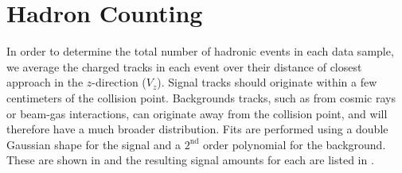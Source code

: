 \section{Hadron Counting}
\label{sec:hadron_counting}

In order to determine the total number of hadronic events in each data sample, we average the charged tracks in each event over their distance of closest approach in the $z$-direction ($V_z$).
Signal tracks should originate within a few centimeters of the collision point.
Backgrounds tracks, such as from cosmic rays or beam-gas interactions, can originate away from the collision point, and will therefore have a much broader distribution.
Fits are performed using a double Gaussian shape for the signal and a $2^{\text{nd}}$ order polynomial for the background.
These are shown in  and the resulting signal amounts for each are listed in .

